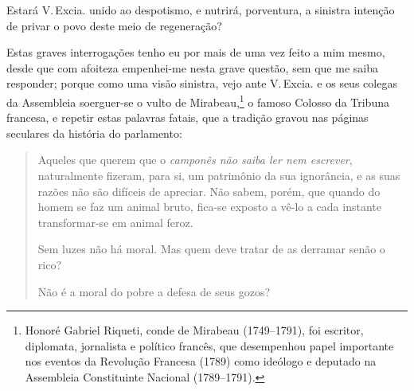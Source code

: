 Estará V.\,Excia. unido ao despotismo, e nutrirá, porventura, a sinistra
intenção de privar o povo deste meio de regeneração?

Estas graves interrogações tenho eu por mais de uma vez feito a mim
mesmo, desde que com afoiteza empenhei-me nesta grave questão, sem que
me saiba responder; porque como uma visão sinistra, vejo ante V.\,Excia.
e os seus colegas da Assembleia soerguer-se o vulto de
Mirabeau,\footnote{Honoré Gabriel Riqueti, conde de Mirabeau (1749--1791), foi
  escritor, diplomata, jornalista e político francês, que desempenhou
  papel importante nos eventos da Revolução Francesa (1789) como
  ideólogo e deputado na Assembleia Constituinte Nacional (1789--1791).}
o famoso Colosso da Tribuna francesa, e repetir estas palavras fatais,
que a tradição gravou nas páginas seculares da história do parlamento:

\begin{quote}
Aqueles que querem que o \emph{camponês não saiba ler nem escrever},
naturalmente fizeram, para si, um patrimônio da sua ignorância, e as
suas razões não são difíceis de apreciar. Não sabem, porém, que quando
do homem se faz um animal bruto, fica-se exposto a vê-lo a cada instante
transformar-se em animal feroz.

Sem luzes não há moral. Mas quem deve tratar de as derramar senão o
rico?

Não é a moral do pobre a defesa de seus gozos?
\end{quote}

